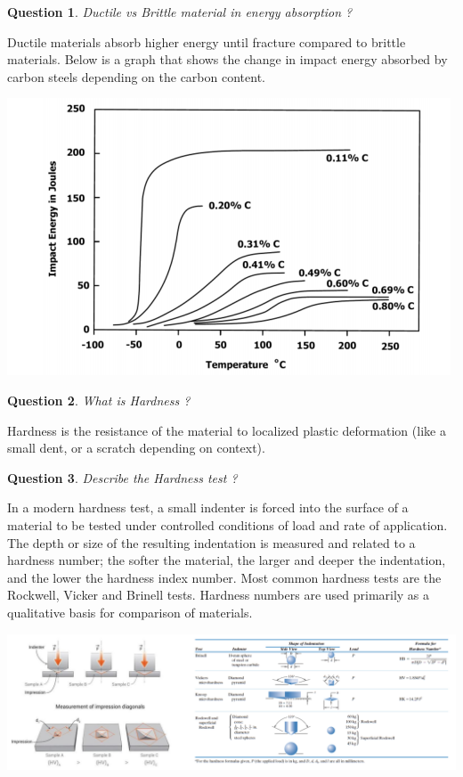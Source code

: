 \documentclass[13]{article}
\newtheorem{exer}{Question}
\begin{document}
\begin{exer}
Ductile vs Brittle material in energy absorption ?
\end{exer}
Ductile materials absorb higher energy until fracture compared to 
brittle materials. Below is  a graph that shows the change in impact 
energy absorbed by carbon steels depending on the carbon content. 
\begin{center}
\includegraphics[scale=0.5]{figures/32.png}
\end{center}
\begin{exer}
What is Hardness ?
\end{exer}
Hardness is the resistance of the material to localized plastic deformation (like a small dent, or a scratch depending on context).
\begin{exer}
Describe the Hardness test ?
\end{exer}
In a modern hardness test, a small indenter is forced into the surface of a
material to be tested under controlled conditions of load and rate of
application. The depth or size of the resulting indentation is measured and
related to a hardness number; the softer the material, the larger and deeper
the indentation, and the lower the hardness index number. Most common
hardness tests are the Rockwell, Vicker and Brinell tests. Hardness numbers
are used primarily as a qualitative basis for comparison of materials.
\begin{center}
\includegraphics[scale=0.5]{figures/33.png}
\end{center}
\end{document}

